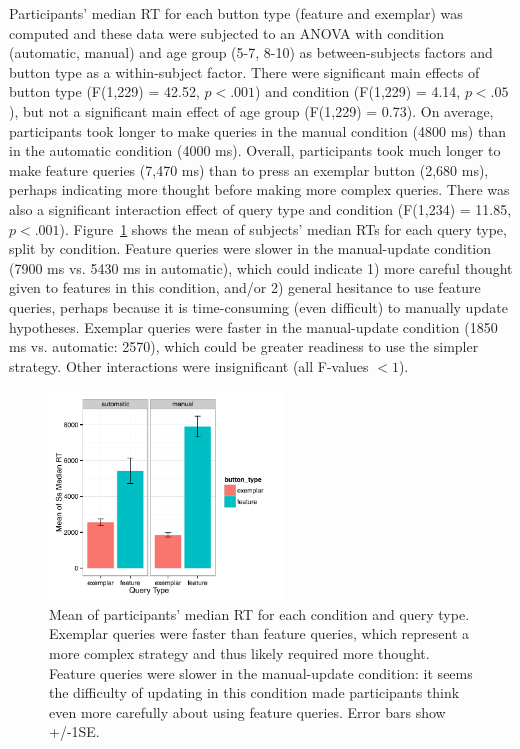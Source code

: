 \documentclass[man,floatsintext]{apa6}
\begin{document}
Participants' median RT for each button type (feature and exemplar) was computed and these data were subjected to an ANOVA with condition (automatic, manual) and age group (5-7, 8-10) as 
between-subjects factors and button type as a within-subject factor. There
were significant main effects of button type (F(1,229) = 42.52, $p<.
001$) and condition (F(1,229) = 4.14, $p<.05$), but not a significant main effect of age group (F(1,229) = 0.73). On average, participants took longer to make queries in the manual 
condition (4800 ms) than in the automatic condition (4000 ms). Overall, participants took much 
longer to make feature queries (7,470 ms) than to press an exemplar button (2,680 ms), 
perhaps indicating more thought before making more complex queries. There was also a significant 
interaction effect of query type and condition (F(1,234) = 11.85, $p<.001$). Figure~\ref{fig:basic-rt} shows 
the mean of subjects' median RTs for each query type, split by condition. Feature queries were 
slower in the manual-update condition (7900 ms vs. 5430 ms in automatic), which could indicate 
1) more careful thought given to features in this condition, and/or 2) general hesitance to use feature 
queries, perhaps because it is time-consuming (even difficult) to manually update hypotheses. 
Exemplar queries were faster in the manual-update condition (1850 ms vs. automatic: 2570),
which could be greater readiness to use the simpler strategy. Other interactions were insignificant (all F-values $<1$).

\begin{figure}[h]
  \centering
  \includegraphics[width=0.55\textwidth]{figures/RT_by_condition_query_type}
  \caption{Mean of participants' median RT for each condition and query type. 
Exemplar queries were faster than feature queries, which represent a more complex 
strategy and thus likely required more thought. Feature queries were slower in the 
manual-update condition: it seems the difficulty of updating in this condition made 
participants think even more carefully about using feature queries. Error bars show 
+/-1SE.}
  \label{fig:basic-rt}
\end{figure} 
\end{document}
